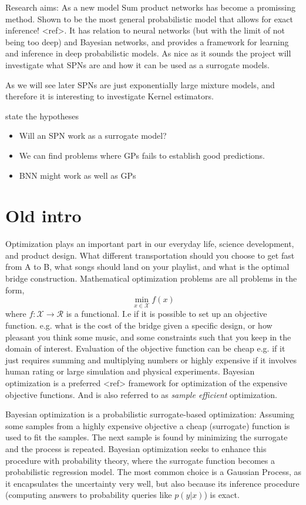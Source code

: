 Research aims:
As a new model Sum product networks has become a promissing method. Shown to be the most 
general probabilistic model that allows for exact inference! <ref>. It has relation to 
neural networks (but with the limit of not being too deep) and Bayesian networks, and provides
a framework for learning and inference in deep probabilistic models. As nice as it sounds
the project will investigate what SPNs are and how it can be used as a surrogate models. 

As we will see later SPNs are just exponentially large mixture models, and therefore 
it is interesting to investigate Kernel estimators.

state the hypotheses
\begin{itemize}
    \item Will an SPN work as a surrogate model?
    \item We can find problems where GPs fails to establish good predictions. 
    \item BNN might work as well as GPs
\end{itemize}



\section{Old intro}
Optimization plays an important part in our everyday life, science development, and product design.
What different transportation should you choose to get fast from A to B, what songs should
land on your playlist, and what is the optimal bridge construction. Mathematical optimization problems 
are all problems in the form, 
$$\min_{x\in \mathcal{X}} f(x)$$ where $f: \mathcal{X} \rightarrow \mathcal{R}$ is a functional. I.e
if it is possible to set up an objective function. e.g. what is the cost of the bridge given a
specific design, or how pleasant you think some music, and some constraints such that you keep in
the domain of interest. Evaluation of the objective function can be cheap e.g. if it just requires
summing and multiplying numbers or highly expensive if it involves human rating or large simulation
and physical experiments. Bayesian optimization is a preferred <ref> framework for optimization of
the expensive objective functions. And is also referred to as \textit{sample efficient}
optimization. 

Bayesian optimization is a probabilistic surrogate-based optimization: Assuming some samples from a
highly expensive objective a cheap (surrogate) function is used to fit the samples. The next sample
is found by minimizing the surrogate and the process is repeated. Bayesian optimization seeks to
enhance this procedure with probability theory, where the surrogate function becomes a probabilistic
regression model. The most common choice is a Gaussian Process, as it encapsulates the uncertainty very well,
but also because its inference procedure (computing answers to probability queries like $p(y|x)$) is exact.

